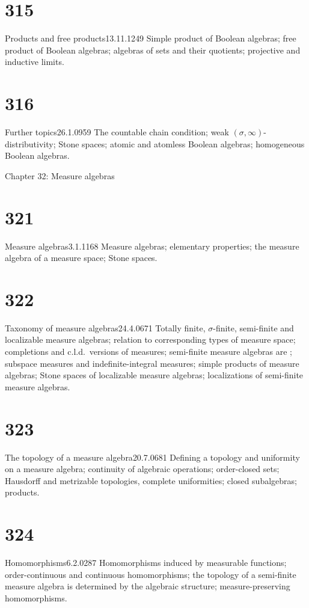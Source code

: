 \section{315}{Products and free products}{13.11.12}{49}{}
{Simple product of Boolean algebras;  free product of Boolean
algebras;  algebras of sets and their quotients;  projective and inductive
limits.}
     
\section{316}{Further topics}{26.1.09}{59}{}
{The countable chain condition;  weak
$(\sigma,\infty)$-distributivity;  Stone spaces;  atomic and atomless
Boolean algebras;  homogeneous Boolean algebras.}
     
     
 Chapter 32:  Measure algebras
     
     
\section{321}{Measure algebras}{3.1.11}{68}{}
{Measure algebras;  elementary properties;  the measure algebra of
a measure space;  Stone spaces.}
     
\section{322}{Taxonomy of measure algebras}{24.4.06}{71}{}
{Totally finite, $\sigma$-finite, semi-finite and localizable
measure algebras;  relation to corresponding types of measure space;
completions and c.l.d.\ versions of measures;  semi-finite measure
algebras are \wsid;  subspace measures and indefinite-integral measures;  
simple products of measure
algebras;  Stone spaces of localizable measure algebras;  localizations
of semi-finite measure algebras.}
     
\section{323}{The topology of a measure algebra}{20.7.06}{81}{}
{Defining a topology and uniformity on a measure algebra;
continuity of algebraic operations;  order-closed sets;  Hausdorff and
metrizable topologies, complete uniformities;  closed subalgebras;
products.}
     
\section{324}{Homomorphisms}{6.2.02}{87}{}
{Homomorphisms induced by measurable functions;  order-continuous
and continuous homomorphisms;  the topology of a semi-finite measure
algebra is determined by the algebraic structure;  measure-preserving
homomorphisms.}
     
